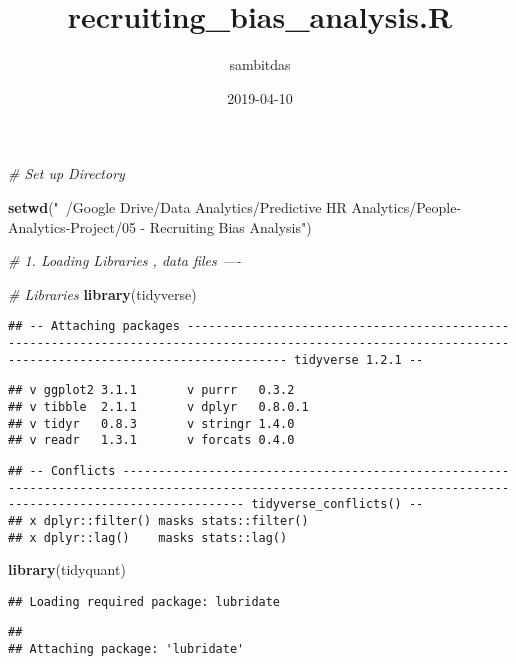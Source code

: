 \documentclass[]{article}
\title{recruiting\_bias\_analysis.R}
\author{sambitdas}
\date{2019-04-10}
\newenvironment{Shaded}{\begin{snugshade}}{\end{snugshade}}
\newcommand{\KeywordTok}[1]{\textcolor[rgb]{0.13,0.29,0.53}{\textbf{#1}}}
\newcommand{\StringTok}[1]{\textcolor[rgb]{0.31,0.60,0.02}{#1}}
\newcommand{\CommentTok}[1]{\textcolor[rgb]{0.56,0.35,0.01}{\textit{#1}}}
\newcommand{\NormalTok}[1]{#1}
\begin{document}
\maketitle

\begin{Shaded}
\begin{Highlighting}[]
\CommentTok{# Set up Directory}

\KeywordTok{setwd}\NormalTok{(}\StringTok{"~/Google Drive/Data Analytics/Predictive HR Analytics/People-Analytics-Project/05 - Recruiting Bias Analysis"}\NormalTok{)}


\CommentTok{# 1. Loading Libraries , data files  ----}

\CommentTok{# Libraries}
\KeywordTok{library}\NormalTok{(tidyverse)}
\end{Highlighting}
\end{Shaded}

\begin{verbatim}
## -- Attaching packages ---------------------------------------------------------------------------------------------------------------------------------------------------------- tidyverse 1.2.1 --
\end{verbatim}

\begin{verbatim}
## v ggplot2 3.1.1       v purrr   0.3.2  
## v tibble  2.1.1       v dplyr   0.8.0.1
## v tidyr   0.8.3       v stringr 1.4.0  
## v readr   1.3.1       v forcats 0.4.0
\end{verbatim}

\begin{verbatim}
## -- Conflicts ------------------------------------------------------------------------------------------------------------------------------------------------------------- tidyverse_conflicts() --
## x dplyr::filter() masks stats::filter()
## x dplyr::lag()    masks stats::lag()
\end{verbatim}

\begin{Shaded}
\begin{Highlighting}[]
\KeywordTok{library}\NormalTok{(tidyquant)}
\end{Highlighting}
\end{Shaded}

\begin{verbatim}
## Loading required package: lubridate
\end{verbatim}

\begin{verbatim}
## 
## Attaching package: 'lubridate'
\end{verbatim}
\end{document}

